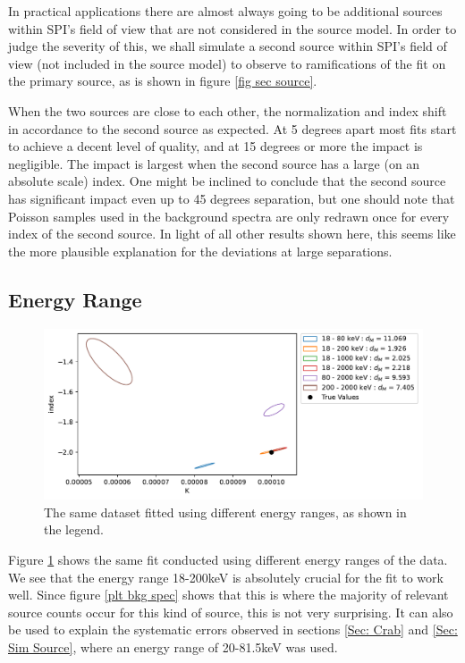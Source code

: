 \documentclass{article}
\begin{document}
In practical applications there are almost always going to be additional sources within SPI's field of view that are not considered in the source model. In order to judge the severity of this, we shall simulate a second source within SPI's field of view (not included in the source model) to observe to ramifications of the fit on the primary source, as is shown in figure \ref{fig sec source}. 

When the two sources are close to each other, the normalization and index shift in accordance to the second source as expected. At 5 degrees apart most fits start to achieve a decent level of quality, and at 15 degrees or more the impact is negligible. The impact is largest when the second source has a large (on an absolute scale) index. One might be inclined to conclude that the second source has significant impact even up to 45 degrees separation, but one should note that Poisson samples used in the background spectra are only redrawn once for every index of the second source. In light of all other results shown here, this seems like the more plausible explanation for the deviations at large separations. 

\FloatBarrier

\subsection{Energy Range}

\begin{figure}[h]
    \centering
    \includegraphics[width=\textwidth]{Images/energy_ranges.pdf}
    \caption{The same dataset fitted using different energy ranges, as shown in the legend.}
    \label{fig energy range}
\end{figure}

Figure \ref{fig energy range} shows the same fit conducted using different energy ranges of the data. We see that the energy range 18-200keV is absolutely crucial for the fit to work well. Since figure \ref{plt bkg spec} shows that this is where the majority of relevant source counts occur for this kind of source, this is not very surprising. It can also be used to explain the systematic errors observed in sections \ref{Sec: Crab} and \ref{Sec: Sim Source}, where an energy range of 20-81.5keV was used.
\end{document}
